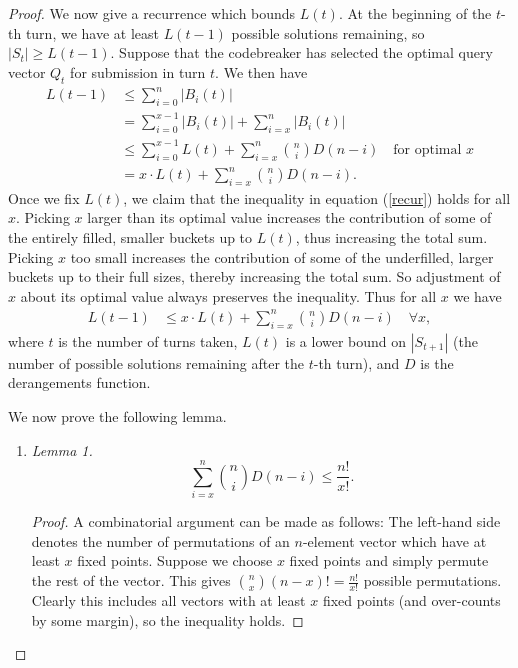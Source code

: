 \documentclass[12pt, a4paper]{article}
\begin{document}
\begin{proof}
		 We now give a recurrence which bounds $L(t)$. At the beginning of the $t$-th turn, we have at least $L(t-1)$ possible solutions remaining, so $|S_t|\ge L(t-1)$. Suppose that the codebreaker has selected the optimal query vector $Q_t$ for submission in turn $t$. We then have 
		\begin{align}\label{recur}
			L(t-1)
			& \le \sum_{i = 0}^{n}|B_i(t)|\nonumber\\
			& = \sum_{i=0}^{x-1}|B_i(t)| + \sum_{i=x}^{n}|B_i(t)|\nonumber\\
			& \le \sum_{i = 0}^{x-1}L(t) + \sum_{i=x}^{n}\binom{n}{i}D(n-i)\quad
			\text{for optimal $x$}\nonumber\\
			& = x\cdot L(t) + \sum_{i = x}^{n}\binom{n}{i}D(n-i).
		\end{align}
		Once we fix $L(t)$, we claim that the inequality in equation (\ref{recur}) holds for all $x$. Picking $x$ larger than its optimal value increases the contribution of some of the entirely filled, smaller buckets up to $L(t)$, thus increasing the total sum. Picking $x$ too small increases the contribution of some of the underfilled, larger buckets up to their full sizes, thereby increasing the total sum. So adjustment of $x$ about its optimal value always preserves the inequality. Thus for all $x$ we have
		\begin{align*}
			L(t-1) & \le x\cdot L(t) + \sum_{i=x}^n\binom{n}{i}D(n-i)\quad\forall x,
		\end{align*}
		where $t$ is the number of turns taken, $L(t)$ is a lower bound on $|S_{t+1}|$ (the number of possible solutions remaining after the $t$-th turn), and $D$ is the derangements function.
		
		We now prove the following lemma.
		\begin{enumerate}[label=]
			\item\textit{Lemma 1.}
			\begin{equation*}
				\sum_{i=x}^n\binom{n}{i}D(n-i) \le \frac{n!}{x!}.
			\end{equation*}
			\begin{proof}
				A combinatorial argument can be made as follows: The left-hand side denotes the number of permutations of an $n$-element vector which have at least $x$ fixed points. Suppose we choose $x$ fixed points and simply permute the rest of the vector. This gives $\binom{n}{x}(n-x)!=\frac{n!}{x!}$ possible permutations. Clearly this includes all vectors with at least $x$ fixed points (and over-counts by some margin), so the inequality holds.
			\end{proof}
		\end{enumerate}
		

\end{proof}
\end{document}
